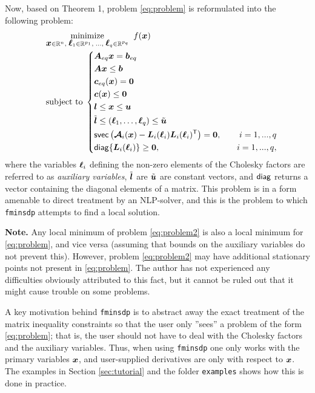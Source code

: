 \documentclass{article}
\newcommand{\bm}[1]{\mbox{\boldmath $#1$}}
\newcommand{\T}{\textsf{T}}
\newcommand{\svec}{\mbox{\textsf{svec}}}
\begin{document}
Now, based on Theorem 1, problem \eqref{eq:problem} is reformulated into the following problem:
\begin{equation}\label{eq:problem2}
\quad
	\begin{aligned}
	&	\underset{\bm{x}\in\mathbb{R}^{n},\; \bm{\ell}_{1}\in\mathbb{R}^{p_{1}},\;\ldots ,\;\bm{\ell}_{q}\in\mathbb{R}^{p_{q}}}{\mbox{minimize}} \;\; f(\bm{x})  \\
	&	\mbox{subject to} \;
	\left\{
		\begin{aligned}
			& \bm{A}_{eq}\bm{x} = \bm{b}_{eq} &\\
			& \bm{A}\bm{x} \leq \bm{b}	      &\\
			& \bm{c}_{eq}(\bm{x}) = \bm{0}	 	&\\
		  & \bm{c}(\bm{x}) \leq \bm{0}			&\\
			& \bm{l} \leq \bm{x} \leq \bm{u}	&\\
			& \tilde{\bm{l}} \leq (\bm{\ell}_{1},\ldots,\bm{\ell}_{q}) \leq \tilde{\bm{u}} & \\
			& \svec\left(\bm{\mathcal{A}}_{i}(\bm{x}) - \bm{L}_{i}(\bm{\ell}_{i})\bm{L}_{i}(\bm{\ell}_{i})^{\T}\right) = \bm{0}, & \quad i = 1,...,q \\
			& \mbox{\textsf{diag}}\{\bm{L}_{i}(\bm{\ell}_{i})\} \geq \bm{0}, & \quad i = 1,...,q,
		\end{aligned}
		\right.
	\end{aligned}
\end{equation}
where the variables $\bm{\ell}_{i}$ defining the non-zero elements of the Cholesky factors are referred to as \textit{auxiliary variables}, $\tilde{\bm{l}}$ are $\tilde{\bm{u}}$ are constant vectors, and $\mbox{\textsf{diag}}$ returns a vector containing the diagonal elements of a matrix. This problem is in a form amenable to direct treatment by an NLP-solver, and this is the problem to which \texttt{fminsdp} attempts to find a local solution.

\vskip 2mm
\noindent \textbf{Note.} Any local minimum of problem \eqref{eq:problem2} is also a local minimum for \eqref{eq:problem}, and vice versa (assuming that bounds on the auxiliary variables do not prevent this). However, problem \eqref{eq:problem2} may have additional stationary points not present in \eqref{eq:problem}. The author has not experienced any difficulties obviously attributed to this fact, but it cannot be ruled out that it might cause trouble on some problems.
\vskip 2mm

A key motivation behind \texttt{fminsdp} is to abstract away the exact treatment of the matrix inequality constraints so that the user only ''sees'' a problem of the form \eqref{eq:problem}; that is, the user should not have to deal with the Cholesky factors and the auxiliary variables. Thus, when using \texttt{fminsdp} one only works with the primary variables $\bm{x}$, and user-supplied derivatives are only with respect to $\bm{x}$. The examples in Section \ref{sec:tutorial} and the folder \texttt{examples} shows how this is done in practice.
\end{document}
